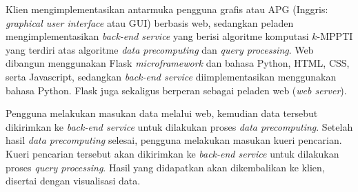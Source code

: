 Klien mengimplementasikan antarmuka pengguna grafis atau APG (Inggris: \textit{graphical user interface} atau GUI) berbasis web, sedangkan peladen mengimplementasikan \textit{back-end service} yang berisi algoritme komputasi $k$-MPPTI yang terdiri atas algoritme \textit{data precomputing} dan \textit{query processing}. Web dibangun menggunakan Flask \textit{microframework} dan bahasa Python, HTML, CSS, serta Javascript, sedangkan \textit{back-end service} diimplementasikan menggunakan bahasa Python. Flask juga sekaligus berperan sebagai peladen web (\textit{web server}).

Pengguna melakukan masukan data melalui web, kemudian data tersebut dikirimkan ke \textit{back-end service} untuk dilakukan proses \textit{data precomputing}. Setelah hasil \textit{data precomputing} selesai, pengguna melakukan masukan kueri pencarian. Kueri pencarian tersebut akan dikirimkan ke \textit{back-end service} untuk dilakukan proses \textit{query processing}. Hasil yang didapatkan akan dikembalikan ke klien, disertai dengan visualisasi data.
